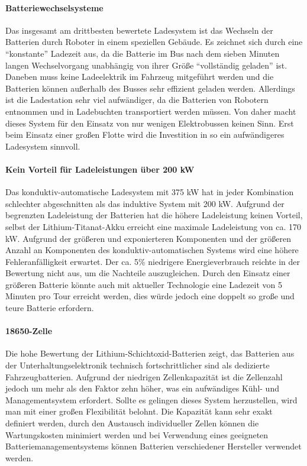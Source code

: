 \paragraph{Batteriewechselsysteme} Das insgesamt am drittbesten bewertete Ladesystem ist das Wechseln der Batterien durch Roboter in einem speziellen Gebäude. Es zeichnet sich durch eine "`konstante"' Ladezeit aus, da die Batterie im Bus nach dem sieben Minuten langen Wechselvorgang unabhängig von ihrer Größe "`vollständig geladen"' ist. Daneben muss keine Ladeelektrik im Fahrzeug mitgeführt werden und die Batterien können außerhalb des Busses sehr effizient geladen werden. Allerdings ist die Ladestation sehr viel aufwändiger, da die Batterien  von Robotern entnommen und in Ladebuchten transportiert werden müssen. Von daher macht dieses System für den Einsatz von nur wenigen Elektrobussen keinen Sinn. Erst beim Einsatz einer großen Flotte wird die Investition in so ein aufwändigeres Ladesystem sinnvoll.

\paragraph{Kein Vorteil für Ladeleistungen über 200 kW} Das konduktiv-automatische Ladesystem mit 375 kW hat in jeder Kombination schlechter abgeschnitten als das induktive System mit 200 kW. Aufgrund der begrenzten Ladeleistung der Batterien hat die höhere Ladeleistung keinen Vorteil, selbst der Lithium-Titanat-Akku erreicht eine maximale Ladeleistung von ca. 170 kW. Aufgrund der größeren und exponierteren Komponenten und der größeren Anzahl an Komponenten des konduktiv-automatischen Systems wird eine höhere Fehleranfälligkeit erwartet. Der ca. 5\% niedrigere Energieverbrauch reichte in der Bewertung nicht aus, um die Nachteile auszugleichen. Durch den Einsatz einer größeren Batterie könnte auch mit aktueller Technologie eine Ladezeit von 5 Minuten pro Tour erreicht werden, dies würde jedoch eine doppelt so große und teure Batterie erfordern.

\paragraph{18650-Zelle} Die hohe Bewertung der Lithium-Schichtoxid-Batterien zeigt, das Batterien aus der Unterhaltungselektronik technisch fortschrittlicher sind als dedizierte Fahrzeugbatterien. Aufgrund der niedrigen Zellenkapazität ist die Zellenzahl jedoch um mehr als den Faktor zehn höher, was ein aufwändiges Kühl- und Managementsystem erfordert. Sollte es gelingen dieses System herzustellen, wird man mit einer großen Flexibilität belohnt. Die Kapazität kann sehr exakt definiert werden, durch den Austausch individueller Zellen können die Wartungskosten minimiert werden und bei Verwendung eines geeigneten Batteriemanagementsystems können Batterien verschiedener Hersteller verwendet werden.

